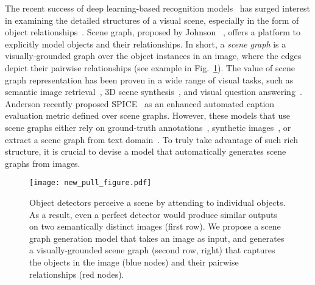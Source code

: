 \documentclass[10pt,twocolumn,letterpaper]{article}
\begin{document}
The recent success of deep learning-based recognition models~\cite{he2015deep,krizhevsky2012imagenet,simonyan2014very} has surged interest in
examining the detailed structures of a visual scene, especially in the form of
object relationships~\cite{chao2015hico,VG,lu2016visual,BMVC2015_52}. Scene graph, proposed by Johnson \etal~\cite{Johnson2015-lm}, offers a platform to explicitly model objects and their relationships. In short, a \emph{scene graph} is a visually-grounded graph over the object instances in an image, where the edges
depict their pairwise relationships (see example in Fig.~\ref{fig:intro_figure}). 
The value of scene graph representation has been proven in a wide range of visual tasks, such as semantic image retrieval~\cite{Johnson2015-lm}, 3D scene synthesis~\cite{chang2014learning}, and visual question answering~\cite{teney2016graph}. Anderson \etal recently proposed SPICE~\cite{spice2016} as an enhanced automated caption evaluation metric defined over scene graphs.
However, these models that use scene graphs either rely on
ground-truth annotations~\cite{Johnson2015-lm}, synthetic images~\cite{teney2016graph}, or extract a scene graph from text domain~\cite{spice2016,chang2014learning}. 
To truly take advantage of such rich structure, it is crucial to devise a model that automatically generates scene graphs from images. 

\begin{figure}[t!]
\begin{center}
\texttt{[image: new\_pull\_figure.pdf]}
\caption{Object detectors perceive a scene by attending to individual objects. As a result, even a perfect detector would produce similar outputs on two semantically distinct images (first row). We propose a scene graph generation model that takes an image as input, and generates a visually-grounded scene graph (second row, right) that captures the objects in the image (blue nodes) and their pairwise relationships (red nodes).}
\vspace{-20pt}
\end{center}
\label{fig:intro_figure}
\end{figure}
\end{document}
